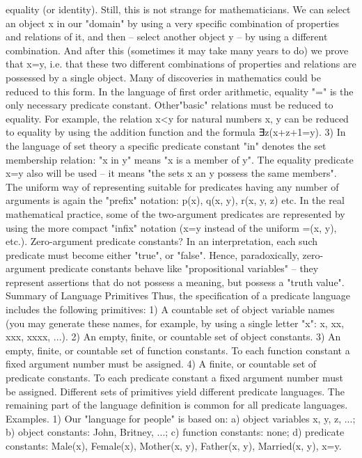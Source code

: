 equality (or identity). Still, this is not strange for mathematicians. We can select an object x in our "domain" by using a very
specific combination of properties and relations of it, and then – select another object y – by using a different combination.
And after this (sometimes it may take many years to do) we prove that x=y, i.e. that these two different combinations of
properties and relations are possessed by a single object. Many of discoveries in mathematics could be reduced to this form.
In the language of first order arithmetic, equality "=" is the only necessary predicate constant. Other"basic" relations must be
reduced to equality. For example, the relation x<y for natural numbers x, y can be reduced to equality by using the addition
function and the formula ∃z(x+z+1=y).
3) In the language of set theory a specific predicate constant "in" denotes the set membership relation: "x in y" means "x is a
member of y". The equality predicate x=y also will be used – it means "the sets x an y possess the same members".
The uniform way of representing suitable for predicates having any number of arguments is again the
"prefix" notation: p(x), q(x, y), r(x, y, z) etc. In the real mathematical practice, some of the two-argument
predicates are represented by using the more compact "infix" notation (x=y instead of the uniform =(x, y),
etc.).
Zero-argument predicate constants? In an interpretation, each such predicate must become either "true", or "false". Hence,
paradoxically, zero-argument predicate constants behave like "propositional variables" – they represent assertions that do not
possess a meaning, but possess a "truth value".
Summary of Language Primitives
Thus, the specification of a predicate language includes the following primitives:
1) A countable set of object variable names (you may generate these names, for example, by using a
single letter "x": x, xx, xxx, xxxx, ...).
2) An empty, finite, or countable set of object constants.
3) An empty, finite, or countable set of function constants. To each function constant a fixed argument
number must be assigned.
4) A finite, or countable set of predicate constants. To each predicate constant a fixed argument number
must be assigned.
Different sets of primitives yield different predicate languages. The remaining part of the language
definition is common for all predicate languages.
Examples. 1) Our "language for people" is based on: a) object variables x, y, z, ...; b) object constants: John, Britney, ...; c)
function constants: none; d) predicate constants: Male(x), Female(x), Mother(x, y), Father(x, y), Married(x, y), x=y.
